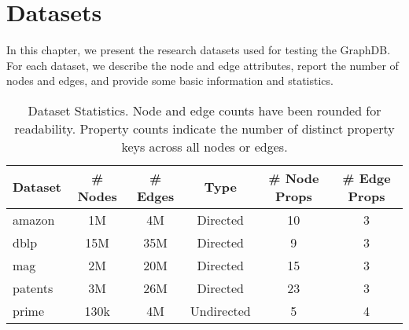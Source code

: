 \chapter{Datasets}
\label{chap:datasets-graphs}

In this chapter, we present the research datasets used for testing the GraphDB. For each dataset, we describe the node and edge attributes, report the number of nodes and edges, and provide some basic information and statistics.

\begin{table}[htbp]
  \centering
  \caption{Dataset Statistics. Node and edge counts have been rounded for readability. Property counts indicate the number of distinct property keys across all nodes or edges.}
  \setlength{\tabcolsep}{4pt} %
  \renewcommand{\arraystretch}{0.9} %
  \small %
  \begin{tabular}{lccccc}
    \toprule
    Dataset & \# Nodes & \# Edges & Type & \# Node Props & \# Edge Props  \\
    \midrule
    amazon  & 1M   & 4M  & Directed   & 10 & 3 \\
    dblp          & 15M  & 35M & Directed   & 9  & 3 \\
    mag     & 2M   & 20M & Directed   & 15 & 3 \\
    patents       & 3M   & 26M & Directed   & 23 & 3 \\
    prime   & 130k & 4M  & Undirected & 5  & 4 \\
    \bottomrule
  \end{tabular}
\end{table}







% 
